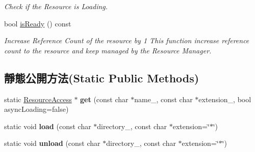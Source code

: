 \begin{DoxyCompactItemize}
\begin{DoxyCompactList}\small\item\em Check if the Resource is Loading. \end{DoxyCompactList}\item 
bool \hyperlink{class_i_dream_sky_1_1_resource_access_a8451cc6dd389b29bb16fa4575614ba9a}{is\+Ready} () const \hypertarget{class_i_dream_sky_1_1_resource_access_a8451cc6dd389b29bb16fa4575614ba9a}{}\label{class_i_dream_sky_1_1_resource_access_a8451cc6dd389b29bb16fa4575614ba9a}

\begin{DoxyCompactList}\small\item\em Increase Reference Count of the resource by 1 This function increase reference count to the resource and keep managed by the Resource Manager. \end{DoxyCompactList}\end{DoxyCompactItemize}
\subsection*{靜態公開方法(Static Public Methods)}
\begin{DoxyCompactItemize}
\item 
static \hyperlink{class_i_dream_sky_1_1_resource_access}{Resource\+Access} $\ast$ {\bfseries get} (const char $\ast$name\+\_\+, const char $\ast$extension\+\_\+, bool async\+Loading=false)\hypertarget{class_i_dream_sky_1_1_resource_access_acc0a1ddf8d12b7c80839a07ec87a6dd8}{}\label{class_i_dream_sky_1_1_resource_access_acc0a1ddf8d12b7c80839a07ec87a6dd8}

\item 
static void {\bfseries load} (const char $\ast$directory\+\_\+, const char $\ast$extension=\char`\"{}$\ast$\char`\"{})\hypertarget{class_i_dream_sky_1_1_resource_access_abce2fed1d16d29afba7651ed4ebc6d00}{}\label{class_i_dream_sky_1_1_resource_access_abce2fed1d16d29afba7651ed4ebc6d00}

\item 
static void {\bfseries unload} (const char $\ast$directory\+\_\+, const char $\ast$extension=\char`\"{}$\ast$\char`\"{})\hypertarget{class_i_dream_sky_1_1_resource_access_a78e1244ae000d9ecc092be8ab34cdb89}{}\label{class_i_dream_sky_1_1_resource_access_a78e1244ae000d9ecc092be8ab34cdb89}

\end{DoxyCompactItemize}
